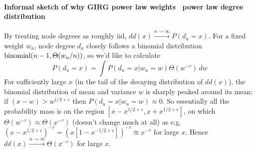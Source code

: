 \paragraph{Informal sketch of why GIRG power law weights \textrightarrow\ power law degree distribution}  
By treating node degrees as roughly iid, $dd(x) \stackrel{n \to \infty}{\to} P(d_u = x)$.
For a fixed weight $w_u$, node degree $d_u$ closely follows a binomial distribution $\operatorname{binomial}(n-1, \Theta(w_u / n))$, so we'd like to calculate 
\begin{equation}
    P(d_u = x) = \int P(d_u = x | w_u = w) \Theta(w^{-\tau}) \,dw
\end{equation}
For sufficiently large $x$ (in the tail of the decaying distribution of $dd(x)$), the binomial distribution of mean and variance $w$ is sharply peaked around its mean: if $(x-w) > w^{1/2 + \epsilon}$ then $P(d_u = x | w_u = w) \approx 0$. 
So essentially all the probability mass is on the region $[x - x^{1/2 + \epsilon}, x + x^{1/2 + \epsilon}]$, on which $\Theta(w^{-\tau}) \approx \Theta(x^{-\tau})$ (doesn't change much at all) as e.g. $(x - x^{1/2 + \epsilon})^{-\tau} = (x[1 - x^{-1/2 + \epsilon}])^{-\tau} \approxeq x^{-\tau}$ for large $x$.
Hence $dd(x) \stackrel{n \to \infty}{\to} \Theta(x^{-\tau})$ for large $x$.





